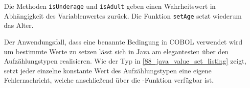 Die Methoden \texttt{isUnderage} und \texttt{isAdult} geben einen Wahrheitswert in Abhängigkeit des Variablenwertes zurück. Die Funktion \texttt{setAge} setzt wiederum das Alter.

Der Anwendungsfall, dass eine benannte Bedingung in COBOL verwendet wird um bestimmte Werte zu setzen lässt sich in Java am elegantesten über den Aufzählungstypen  realisieren. Wie der Typ  in \autoref{88_java_value_set_listing} zeigt, setzt jeder einzelne konstante Wert des Aufzählungstypen eine eigene Fehlernachricht, welche anschließend über die -Funktion verfügbar ist.

